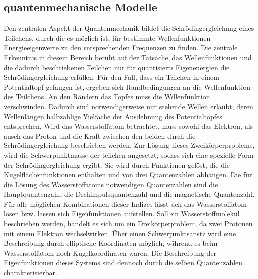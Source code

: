 \subsection{quantenmechanische Modelle}
Den zentralen Aspekt der Quantenmechanik bildet die Schrödingergleichung eines Teilchens,
durch die es möglich ist, für bestimmte Wellenfunktionen Energieeigenwerte zu den 
entsprechenden Frequenzen zu finden. Die zentrale Erkenntnis in diesem Bereich beruht 
auf  der Tatsache, das Wellenfunktionen und die dadurch beschriebenen Teilchen nur für 
quantisierte Eigenenergien die Schrödingergleichung erfüllen.
Für den Fall, dass ein Teilchen in einem Potentialtopf gefangen ist, ergeben sich
Randbedingungen an die Wellenfunktion des Teilchens. An den Rändern das Topfes muss die 
Wellenfunktion verschwinden. Dadurch sind notwendigerweise nur stehende Wellen erlaubt, 
deren Wellenlängen halbzahlige Vielfache der Ausdehnung des Potentialtopfes entsprechen.
Wird das Wasserstoffatom betrachtet, muss sowohl das Elektron, als ausch das Proton 
und die Kraft zwischen den beiden durch die Schrödingergleichung beschrieben werden.
Zur Lösung dieses Zweikörperproblems, wird die Schwerpunktmasse der teilchen angesetzt, 
sodass sich eine spezielle Form der Schrödingergleichung ergibt. Sie wird durch Funktionen 
gelöst, die die Kugelflächenfunktionen enthalten und von drei Quantenzahlen abhängen.
Die für die Lösung des Wasserstoffatoms notwendigen Quantenzahlen sind die Hauptquantenzahl,
die Drehimpulsquantenzahl und die magnetische Quantenzahl. Für alle möglichen Kombinationen dieser
Indizes lässt sich das Wasserstoffatom lösen bzw. lassen sich Eigenfunktionen aufstellen.
Soll ein Wasserstoffmolekül beschrieben werden, handelt es sich um ein Dreikörperproblem,
da zwei Protonen mit einem Elektron wechselwirken. Über einen Schwerpunktsanstz wird
eine Beschreibung durch elliptische Koordinaten möglich, während es beim Wasserstoffatom noch 
Kugelkoordinaten waren. Die Beschreibung der Eigenfunktionen dieses Systems sind dennoch durch 
die selben Quantenzahlen charakterisierbar.

